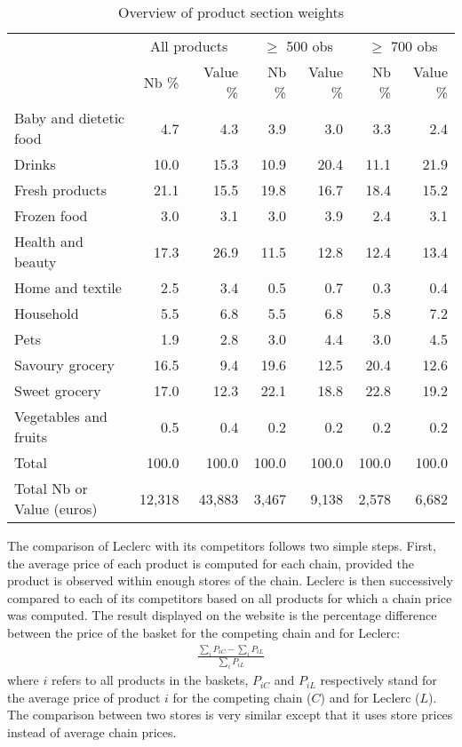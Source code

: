\documentclass[english]{article}
\begin{document}
\begin{table}[H]
\renewcommand{\arraystretch}{0.7}%
\caption{Overview of product section weights}\label{tab:qlmc_sections}
\small
\begin{tabular}{lrr|rr|rr}
\toprule
\toprule
& \multicolumn{2}{c}{All products} & \multicolumn{2}{c|}{$\ge$ 500 obs} & \multicolumn{2}{c|}{$\ge$ 700 obs} \\
& Nb \% & Value \% & Nb \% & Value \% & Nb \% & Value \% \\
\midrule
    Baby and dietetic food & 4.7   & 4.3   & 3.9   & 3.0   & 3.3   & 2.4 \\
    Drinks & 10.0  & 15.3  & 10.9  & 20.4  & 11.1  & 21.9 \\
    Fresh products & 21.1  & 15.5  & 19.8  & 16.7  & 18.4  & 15.2 \\
    Frozen food & 3.0   & 3.1   & 3.0   & 3.9   & 2.4   & 3.1 \\
    Health and beauty & 17.3  & 26.9  & 11.5  & 12.8  & 12.4  & 13.4 \\
    Home and textile & 2.5   & 3.4   & 0.5   & 0.7   & 0.3   & 0.4 \\
    Household & 5.5   & 6.8   & 5.5   & 6.8   & 5.8   & 7.2 \\
    Pets  & 1.9   & 2.8   & 3.0   & 4.4   & 3.0   & 4.5 \\
    Savoury grocery & 16.5  & 9.4   & 19.6  & 12.5  & 20.4  & 12.6 \\
    Sweet grocery & 17.0  & 12.3  & 22.1  & 18.8  & 22.8  & 19.2 \\
    Vegetables and fruits & 0.5   & 0.4   & 0.2   & 0.2   & 0.2   & 0.2 \\
\midrule
    Total & 100.0 & 100.0 & 100.0 & 100.0 & 100.0 & 100.0 \\
    Total Nb or Value (euros) & 12,318 & 43,883 & 3,467 & 9,138 & 2,578 & 6,682 \\
\bottomrule
\bottomrule
\end{tabular}
\end{table}

The comparison of Leclerc with its competitors follows two simple steps. First, the average price of each product is computed for each chain, provided the product is observed within enough stores of the chain. Leclerc is then successively compared to each of its competitors based on all products for which a chain price was computed. The result displayed on the website is the percentage difference between the price of the basket for the competing chain and for Leclerc:
\begin{align*}
\frac{\sum\limits_{i} P_{iC} - \sum\limits_{i} P_{iL}}{\sum\limits_{i} P_{iL}}
\end{align*}
where $i$ refers to all products in the baskets, $P_{iC}$ and $P_{iL}$ respectively stand for the average price of product $i$ for the competing chain ($C$) and for Leclerc ($L$). The comparison between two stores is very similar except that it uses store prices instead of average chain prices.
\end{document}
